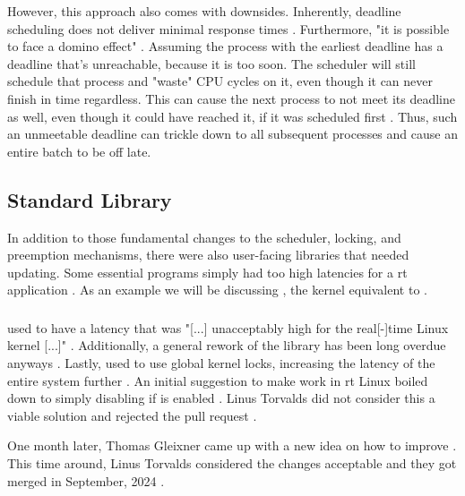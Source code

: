 \documentclass[10pt,twocolumn,a4paper]{article}
\begin{document}
However, this approach also comes with downsides.
Inherently, deadline scheduling does not deliver minimal response times \cite{bristot_de_oliveira_deadline_2018}.
Furthermore, "it is possible to face a domino effect" \cite{bristot_de_oliveira_deadline_2018}.
Assuming the process with the earliest deadline has a deadline that's unreachable, because it is too soon.
The scheduler will still schedule that process and "waste" CPU cycles on it, even though it can never finish in time regardless.
This can cause the next process to not meet its deadline as well, even though it could have reached it, if it was scheduled first \cite{bristot_de_oliveira_deadline_2018}.
Thus, such an unmeetable deadline can trickle down to all subsequent processes and cause an entire batch to be off late.


\subsection{Standard Library}
In addition to those fundamental changes to the scheduler, locking, and preemption mechanisms, there were also user-facing libraries that needed updating.
Some essential programs simply had too high latencies for a \acrshort{rt} application \cite{edge_discussion_2022}.
As an example we will be discussing , the kernel equivalent to .

\subsubsection{}
 used to have a latency that was "[...] unacceptably high for the real[-]time Linux kernel [...]" \cite{edge_discussion_2022}.
Additionally, a general rework of the library has been long overdue anyways \cite{edge_discussion_2022}.
Lastly,  used to use global kernel locks, increasing the latency of the entire system further \cite{gleixner_printk_2024}.
An initial suggestion to make  work in \acrshort{rt} Linux boiled down to simply disabling  if  is enabled \cite{mladek_printk_2022}.
Linus Torvalds did not consider this a viable solution and rejected the pull request \cite{torvalds_initial_2022}.

One month later, Thomas Gleixner came up with a new idea on how to improve  \cite{gleixner_patch_2022}.
This time around, Linus Torvalds considered the changes acceptable and they got merged in September, 2024 \cite{gleixner_printk_2024}.
\end{document}
